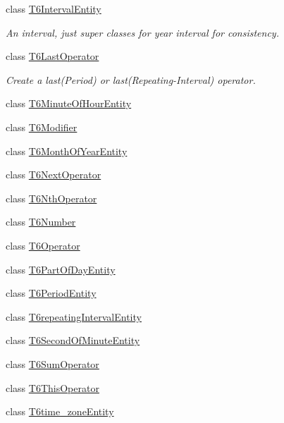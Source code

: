 \begin{DoxyCompactItemize}
\item 
class \hyperlink{classtask6_1_1t6Entities_1_1T6IntervalEntity}{T6\+Interval\+Entity}
\begin{DoxyCompactList}\small\item\em An interval, just super classes for year interval for consistency. \end{DoxyCompactList}\item 
class \hyperlink{classtask6_1_1t6Entities_1_1T6LastOperator}{T6\+Last\+Operator}
\begin{DoxyCompactList}\small\item\em Create a last(\+Period) or last(Repeating-\/\+Interval) operator. \end{DoxyCompactList}\item 
class \hyperlink{classtask6_1_1t6Entities_1_1T6MinuteOfHourEntity}{T6\+Minute\+Of\+Hour\+Entity}
\item 
class \hyperlink{classtask6_1_1t6Entities_1_1T6Modifier}{T6\+Modifier}
\item 
class \hyperlink{classtask6_1_1t6Entities_1_1T6MonthOfYearEntity}{T6\+Month\+Of\+Year\+Entity}
\item 
class \hyperlink{classtask6_1_1t6Entities_1_1T6NextOperator}{T6\+Next\+Operator}
\item 
class \hyperlink{classtask6_1_1t6Entities_1_1T6NthOperator}{T6\+Nth\+Operator}
\item 
class \hyperlink{classtask6_1_1t6Entities_1_1T6Number}{T6\+Number}
\item 
class \hyperlink{classtask6_1_1t6Entities_1_1T6Operator}{T6\+Operator}
\item 
class \hyperlink{classtask6_1_1t6Entities_1_1T6PartOfDayEntity}{T6\+Part\+Of\+Day\+Entity}
\item 
class \hyperlink{classtask6_1_1t6Entities_1_1T6PeriodEntity}{T6\+Period\+Entity}
\item 
class \hyperlink{classtask6_1_1t6Entities_1_1T6repeatingIntervalEntity}{T6repeating\+Interval\+Entity}
\item 
class \hyperlink{classtask6_1_1t6Entities_1_1T6SecondOfMinuteEntity}{T6\+Second\+Of\+Minute\+Entity}
\item 
class \hyperlink{classtask6_1_1t6Entities_1_1T6SumOperator}{T6\+Sum\+Operator}
\item 
class \hyperlink{classtask6_1_1t6Entities_1_1T6ThisOperator}{T6\+This\+Operator}
\item 
class \hyperlink{classtask6_1_1t6Entities_1_1T6time__zoneEntity}{T6time\+\_\+zone\+Entity}
\item 

\end{DoxyCompactItemize}
